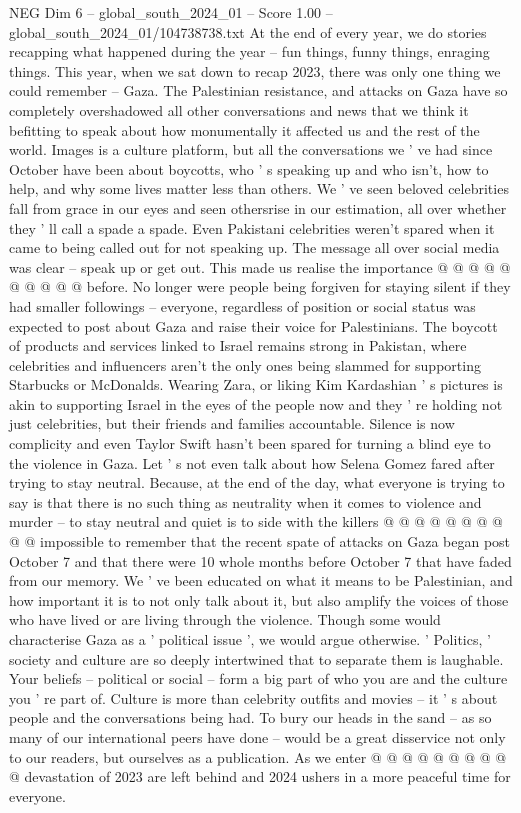 \begin{textsample}{NEG Dim 6 – global\_south\_2024\_01 – Score 1.00 – global\_south\_2024\_01/104738738.txt}  \label{ex:f6_neg_374}
At the end of every year, we do stories recapping what happened during the year -- fun things, funny things, enraging things.
This year, when we sat down to recap 2023, there was only one thing we could remember -- Gaza.
The Palestinian resistance, and attacks on Gaza have so completely overshadowed all other conversations and news that we think it befitting to speak about how monumentally it affected us and the rest of the world.
Images is a culture platform, but all the conversations we ' ve had since October have been about boycotts, who ' s speaking up and who isn't, how to help, and why some lives matter less than others.
We ' ve seen beloved celebrities fall from grace in our eyes and seen othersrise in our estimation, all over whether they ' ll call a spade a spade.
Even Pakistani celebrities weren't spared when it came to being called out for not speaking up.
The message all over social media was clear -- speak up or get out.
This made us realise the importance @ @ @ @ @ @ @ @ @ @ before.
No longer were people being forgiven for staying silent if they had smaller followings -- everyone, regardless of position or social status was expected to post about Gaza and raise their voice for Palestinians.
The boycott of products and services linked to Israel remains strong in Pakistan, where celebrities and influencers aren't the only ones being slammed for supporting Starbucks or McDonalds.
Wearing Zara, or liking Kim Kardashian ' s pictures is akin to supporting Israel in the eyes of the people now and they ' re holding not just celebrities, but their friends and families accountable.
Silence is now complicity and even Taylor Swift hasn't been spared for turning a blind eye to the violence in Gaza.
Let ' s not even talk about how Selena Gomez fared after trying to stay neutral.
Because, at the end of the day, what everyone is trying to say is that there is no such thing as neutrality when it comes to violence and murder -- to stay neutral and quiet is to side with the killers @ @ @ @ @ @ @ @ @ @ impossible to remember that the recent spate of attacks on Gaza began post October 7 and that there were 10 whole months before October 7 that have faded from our memory.
We ' ve been educated on what it means to be Palestinian, and how important it is to not only talk about it, but also amplify the voices of those who have lived or are living through the violence.
Though some would characterise Gaza as a ' political issue ', we would argue otherwise. ' Politics, ' society and culture are so deeply intertwined that to separate them is laughable.
Your beliefs -- political or social -- form a big part of who you are and the culture you ' re part of.
Culture is more than celebrity outfits and movies -- it ' s about people and the conversations being had.
To bury our heads in the sand -- as so many of our international peers have done -- would be a great disservice not only to our readers, but ourselves as a publication.
As we enter @ @ @ @ @ @ @ @ @ @ devastation of 2023 are left behind and 2024 ushers in a more peaceful time for everyone.

\end{textsample}
